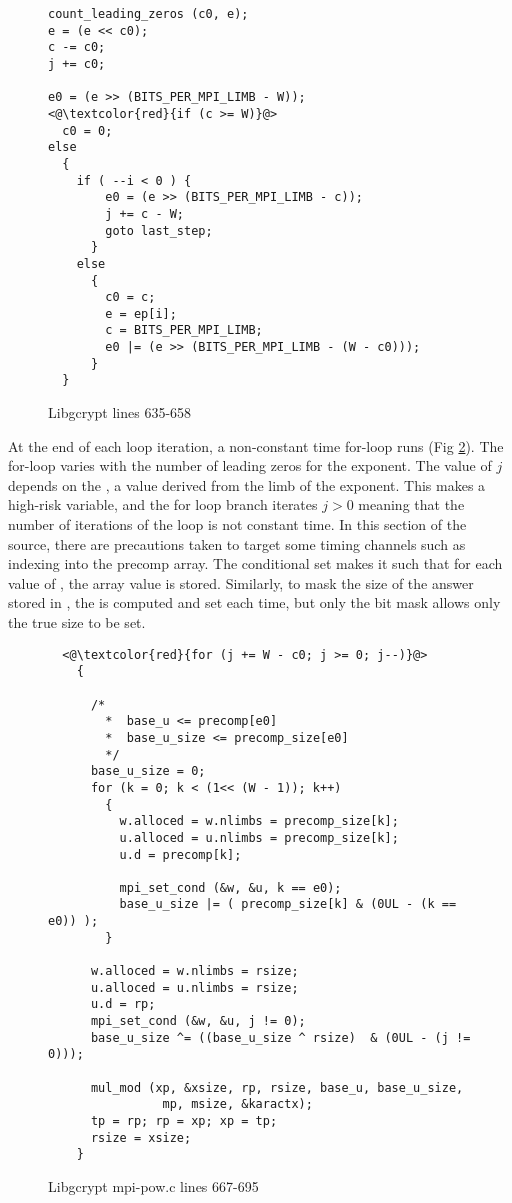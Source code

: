 \begin{figure}[h!]
\begin{lstlisting}
count_leading_zeros (c0, e);
e = (e << c0);
c -= c0;
j += c0;

e0 = (e >> (BITS_PER_MPI_LIMB - W));
<@\textcolor{red}{if (c >= W)}@>
  c0 = 0;
else
  {
    if ( --i < 0 ) {
        e0 = (e >> (BITS_PER_MPI_LIMB - c));
        j += c - W;
        goto last_step;
      }
    else
      {
        c0 = c;
        e = ep[i];
        c = BITS_PER_MPI_LIMB;
        e0 |= (e >> (BITS_PER_MPI_LIMB - (W - c0)));
      }
  }
\end{lstlisting}
\caption{Libgcrypt lines 635-658}
\label{code:libgcrypt_c_window}
\end{figure}

At the end of each loop iteration, a non-constant time for-loop runs (Fig \ref{code:libgcrypt_non_const_for}). The
for-loop varies with the number of leading zeros for the exponent. The value of
$j$ depends on the , a value derived from the limb of the exponent. This
makes  a high-risk variable, and the for loop branch iterates $j > 0$ meaning
that the number of iterations of the loop is not constant time. In this section
of the source, there are precautions taken to target some timing channels such
as indexing into the precomp array. The conditional set makes it such that for
each value of , the array value is stored. Similarly, to mask the size of the
answer stored in , the  is computed and set each time, but only
the bit mask allows only the true size to be set.

\begin{figure}[htpb]
\begin{lstlisting}
  <@\textcolor{red}{for (j += W - c0; j >= 0; j--)}@>
    {

      /*
        *  base_u <= precomp[e0]
        *  base_u_size <= precomp_size[e0]
        */
      base_u_size = 0;
      for (k = 0; k < (1<< (W - 1)); k++)
        {
          w.alloced = w.nlimbs = precomp_size[k];
          u.alloced = u.nlimbs = precomp_size[k];
          u.d = precomp[k];

          mpi_set_cond (&w, &u, k == e0);
          base_u_size |= ( precomp_size[k] & (0UL - (k == e0)) );
        }

      w.alloced = w.nlimbs = rsize;
      u.alloced = u.nlimbs = rsize;
      u.d = rp;
      mpi_set_cond (&w, &u, j != 0);
      base_u_size ^= ((base_u_size ^ rsize)  & (0UL - (j != 0)));

      mul_mod (xp, &xsize, rp, rsize, base_u, base_u_size,
                mp, msize, &karactx);
      tp = rp; rp = xp; xp = tp;
      rsize = xsize;
    }
\end{lstlisting}
\caption{Libgcrypt mpi-pow.c lines 667-695}
\label{code:libgcrypt_non_const_for}
\end{figure}

